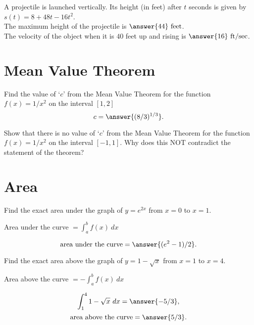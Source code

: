 \documentclass{ximera}
\begin{document}
\begin{problem}
A projectile is launched vertically.  Its height (in feet) after $t$ seconds is given by
$s(t) = 8 + 48t -16t^2$.\\

The maximum height of the projectile is $\answer{44} \ \text{feet}$.\\
The velocity of the object when it is $40$ feet up and rising is $\answer{16} \ \text{ft/sec}$.
\end{problem}


\section{Mean Value Theorem}

\begin{problem}
Find the value of `$c$' from the Mean Value Theorem for the function $f(x) = 1/x^2$ on the interval 
$[1,2]$
\[c=\answer{(8/3)^{1/3}}.\]
\end{problem}

\begin{problem}
Show that there is no value of `$c$' from the Mean Value Theorem for the function 
$f(x) = 1/x^2$ on the interval $[-1, 1]$.  Why does this NOT contradict the statement of the theorem?
\end{problem}

\section{Area}


\begin{problem}
Find the exact area under the graph of $y = e^{2x}$ from $x = 0$ to $x = 1$. \\
\begin{hint}
Area under the curve $= \int_a^b f(x) \ dx$
\end{hint}

\[\text{area under the curve} = \answer{(e^2 -1)/2}.\]
\end{problem}


\begin{problem}
Find the exact area above the graph of $y = 1 - \sqrt x$ from $x = 1$ to $x = 4$. \\
\begin{hint}
Area above the curve $= -\int_a^b f(x) \ dx$
\end{hint}
\[\int_1^4 1 - \sqrt x \ dx = \answer{-5/3},\]
\[\text{area above the curve} = \answer{5/3}.\]
\end{problem}
\end{document}
